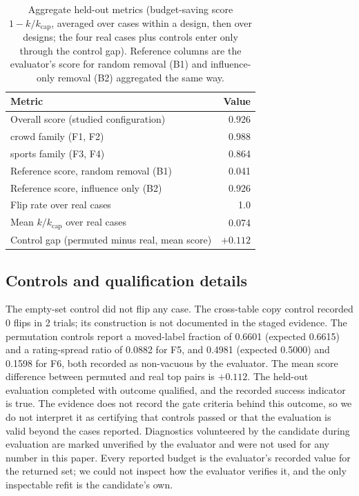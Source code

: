 \documentclass{article}
\newcommand{\kcap}{k_{\mathrm{cap}}}
\begin{document}
\begin{table}[h]
\centering
\caption{Aggregate held-out metrics (budget-saving score $1-k/\kcap$, averaged over cases within a design, then over designs; the four real cases plus controls enter only through the control gap). Reference columns are the evaluator's score for random removal (B1) and influence-only removal (B2) aggregated the same way.}
\label{tab:agg}
\small
\begin{tabular}{lr}
\toprule
Metric & Value\\
\midrule
Overall score (studied configuration) & 0.926\\
\quad crowd family (F1, F2) & 0.988\\
\quad sports family (F3, F4) & 0.864\\
Reference score, random removal (B1) & 0.041\\
Reference score, influence only (B2) & 0.926\\
Flip rate over real cases & 1.0\\
Mean $k/\kcap$ over real cases & 0.074\\
Control gap (permuted minus real, mean score) & $+0.112$\\
\bottomrule
\end{tabular}
\end{table}

\subsection{Controls and qualification details}
The empty-set control did not flip any case. The cross-table copy control recorded 0 flips in 2 trials; its construction is not documented in the staged evidence. The permutation controls report a moved-label fraction of 0.6601 (expected 0.6615) and a rating-spread ratio of 0.0882 for F5, and 0.4981 (expected 0.5000) and 0.1598 for F6, both recorded as non-vacuous by the evaluator. The mean score difference between permuted and real top pairs is $+0.112$. %
The held-out evaluation completed with outcome qualified, and the recorded success indicator is true. The evidence does not record the gate criteria behind this outcome, so we do not interpret it as certifying that controls passed or that the evaluation is valid beyond the cases reported. %
Diagnostics volunteered by the candidate during evaluation are marked unverified by the evaluator and were not used for any number in this paper. Every reported budget is the evaluator's recorded value for the returned set; we could not inspect how the evaluator verifies it, and the only inspectable refit is the candidate's own.
\end{document}
